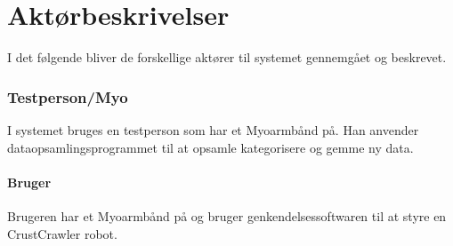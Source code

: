 \thispagestyle{fancy}
\chapter{Aktørbeskrivelser}
\label{chp:aktorbeskrivelser}
I det følgende bliver de forskellige aktører til systemet gennemgået og beskrevet.

\subsection{Testperson/Myo}
I systemet bruges en testperson som har et Myoarmbånd på. Han anvender dataopsamlingsprogrammet til at opsamle kategorisere og gemme ny data. 

\subsubsection{Bruger}
Brugeren har et Myoarmbånd på og bruger genkendelsessoftwaren til at styre en CrustCrawler robot.